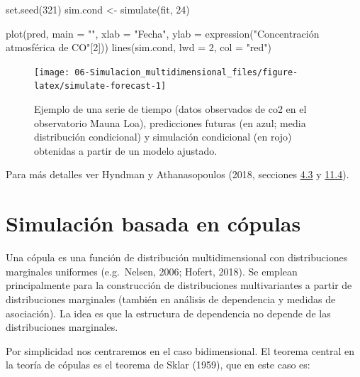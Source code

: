 \documentclass[
]{book}
\newenvironment{Shaded}{\begin{snugshade}}{\end{snugshade}}
\newcommand{\AttributeTok}[1]{\textcolor[rgb]{0.77,0.63,0.00}{#1}}
\newcommand{\DecValTok}[1]{\textcolor[rgb]{0.00,0.00,0.81}{#1}}
\newcommand{\FunctionTok}[1]{\textcolor[rgb]{0.00,0.00,0.00}{#1}}
\newcommand{\NormalTok}[1]{#1}
\newcommand{\OtherTok}[1]{\textcolor[rgb]{0.56,0.35,0.01}{#1}}
\newcommand{\StringTok}[1]{\textcolor[rgb]{0.31,0.60,0.02}{#1}}
\theoremstyle{break}
\theoremstyle{nonumberplain}
\begin{document}
\begin{Shaded}
\begin{Highlighting}[]
\FunctionTok{set.seed}\NormalTok{(}\DecValTok{321}\NormalTok{)}
\NormalTok{sim.cond }\OtherTok{\textless{}{-}} \FunctionTok{simulate}\NormalTok{(fit, }\DecValTok{24}\NormalTok{)}

\FunctionTok{plot}\NormalTok{(pred, }\AttributeTok{main =} \StringTok{""}\NormalTok{, }\AttributeTok{xlab =} \StringTok{"Fecha"}\NormalTok{, }
     \AttributeTok{ylab =} \FunctionTok{expression}\NormalTok{(}\StringTok{"Concentración atmosférica de CO"}\NormalTok{[}\DecValTok{2}\NormalTok{]))}
\FunctionTok{lines}\NormalTok{(sim.cond, }\AttributeTok{lwd =} \DecValTok{2}\NormalTok{, }\AttributeTok{col =} \StringTok{"red"}\NormalTok{)}
\end{Highlighting}
\end{Shaded}

\begin{figure}[!htb]

{\centering \texttt{[image: 06-Simulacion\_multidimensional\_files/figure-latex/simulate-forecast-1]} 

}

\caption{Ejemplo de una serie de tiempo (datos observados de co2 en el observatorio Mauna Loa), predicciones futuras (en azul; media distribución condicional) y simulación condicional (en rojo) obtenidas a partir de un modelo ajustado.}\label{fig:simulate-forecast}
\end{figure}

Para más detalles ver Hyndman y Athanasopoulos (2018, secciones \href{https://otexts.com/fpp2/prediction-intervals.html}{4.3} y \href{https://otexts.com/fpp2/bootstrap.html}{11.4}).

\hypertarget{simulaciuxf3n-basada-en-cuxf3pulas}{%
\section{Simulación basada en cópulas}\label{simulaciuxf3n-basada-en-cuxf3pulas}}

Una cópula es una función de distribución multidimensional con distribuciones marginales uniformes (e.g.~Nelsen, 2006; Hofert, 2018).
Se emplean principalmente para la construcción de distribuciones multivariantes a partir de distribuciones marginales (también en análisis de dependencia y medidas de asociación).
La idea es que la estructura de dependencia no depende de las distribuciones marginales.

Por simplicidad nos centraremos en el caso bidimensional.
El teorema central en la teoría de cópulas es el teorema de Sklar (1959), que en este caso es:
\end{document}
